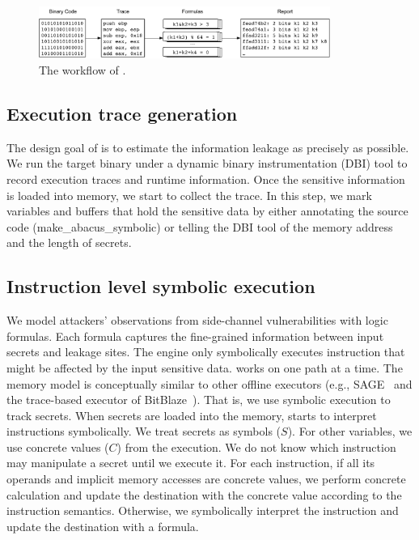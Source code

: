 \begin{figure}[t]
    \centering
    \includegraphics[width=0.85\textwidth]{./figures/chapter4/workflow.pdf}
    \caption{The workflow of \tool{}.}
    \label{fig:workflow}
\end{figure}

\subsection{Execution trace generation} The design goal of \tool{} is to estimate the information leakage as precisely as possible.
We run the target binary under a dynamic binary instrumentation (DBI) tool
to record execution traces and runtime information.
Once the sensitive information is loaded into memory, we start to collect the trace.
In this step, we mark variables and buffers that hold the sensitive data by either annotating the source code (\textsf{make\_abacus\_symbolic}) or telling the DBI tool of the memory address and the length of secrets.

\subsection{Instruction level symbolic execution} We model attackers'
observations from side-channel vulnerabilities with logic formulas.
Each formula captures the fine-grained information between input
secrets and leakage sites. The engine only symbolically executes
instruction that might be affected by the input sensitive data. \tool{} works on one path at a time. The memory model is conceptually similar to other offline executors (e.g., SAGE~\cite{godefroid2008automated} and the trace-based executor of BitBlaze~\cite{song2008bitblaze}). That is, we use symbolic execution to track secrets. When secrets are loaded into the memory, \tool{} starts to interpret instructions symbolically. We treat secrets as symbols ($S$). For other variables, we use concrete values ($C$) from the execution. We do not know which instruction may manipulate a secret until we execute it. For each instruction, if all its operands and implicit memory accesses are concrete values, we perform concrete calculation and update the destination with the concrete value according to the instruction semantics. Otherwise, we symbolically interpret the instruction and update the destination with a formula.


